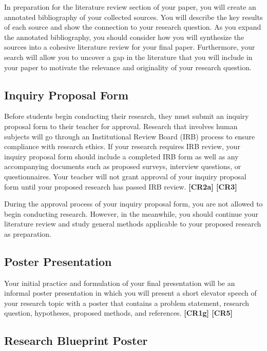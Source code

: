 \documentclass[11pt,]{article}
\begin{document}
In preparation for the literature review section of your paper, you will create an annotated bibliography of your collected sources. You will describe the key results of each source and show the connection to your research question. As you expand the annotated bibliography, you should consider how you will synthesize the sources into a cohesive literature review for your final paper. Furthermore, your search will allow you to uncover a gap in the literature that you will include in your paper to motivate the relevance and originality of your research question.

\hypertarget{inquiry-proposal-form}{%
\subsection{Inquiry Proposal Form}\label{inquiry-proposal-form}}

Before students begin conducting their research, they must submit an inquiry proposal form to their teacher for approval. Research that involves human subjects will go through an Institutional Review Board (IRB) process to ensure compliance with research ethics. If your research requires IRB review, your inquiry proposal form should include a completed IRB form as well as any accompanying documents such as proposed surveys, interview questions, or questionnaires. Your teacher will not grant approval of your inquiry proposal form until your proposed research has passed IRB review. \textbf{{[}CR2a{]} {[}CR3{]}}  

During the approval process of your inquiry proposal form, you are not allowed to begin conducting research. However, in the meanwhile, you should continue your literature review and study general methods applicable to your proposed research as preparation.

\hypertarget{poster-presentation}{%
\subsection{Poster Presentation}\label{poster-presentation}}

Your initial practice and formulation of your final presentation will be an informal poster presentation in which you will present a short elevator speech of your research topic with a poster that contains a problem statement, research question, hypotheses, proposed methods, and references. \textbf{{[}CR1g{]} {[}CR5{]}}  

\hypertarget{research-blueprint-poster}{%
\subsection{Research Blueprint Poster}\label{research-blueprint-poster}}
\end{document}
